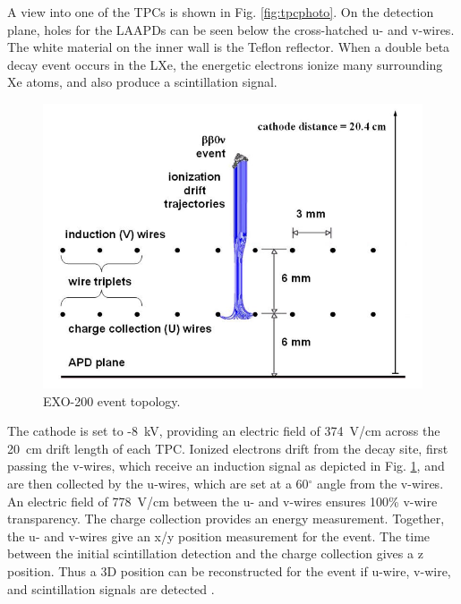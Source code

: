 A view into one of the TPCs is shown in Fig. \ref{fig:tpcphoto}.  On the detection plane, holes for the LAAPDs can be seen below the cross-hatched u- and v-wires.  The white material on the inner wall is the Teflon reflector.  When a double beta decay event occurs in the LXe, the energetic electrons ionize many surrounding Xe atoms, and also produce a scintillation signal.  %

\begin{figure} %
	\centering
	\includegraphics[width=.7\textwidth]{figures/anodecathodedriftcharges.png}
	\caption{EXO-200 event topology.  }
\label{fig:detectionplane}
\end{figure}

The cathode is set to -8~kV, providing an electric field of 374~V/cm across the 20~cm drift length of each TPC.  Ionized electrons drift from the decay site, first passing the v-wires, which receive an induction signal as depicted in Fig. \ref{fig:detectionplane}, and are then collected by the u-wires, which are set at a 60$^\circ$ angle from the v-wires.  An electric field of 778~V/cm between the u- and v-wires ensures 100\% v-wire transparency.  The charge collection provides an energy measurement.  Together, the u- and v-wires give an x/y position measurement for the event.  The time between the initial scintillation detection and the charge collection gives a z position.  Thus a 3D position can be reconstructed for the event if u-wire, v-wire, and scintillation signals are detected \cite{EXO200TwoNuLong}.

